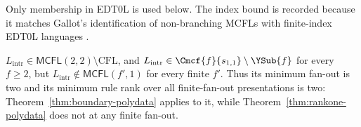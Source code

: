 Only membership in EDT0L is used below.  The index bound is recorded because it
matches Gallot's identification of non-branching MCFLs with finite-index EDT0L
languages \cite[Theorem~29]{Gallot2021}.

\begin{theorem}
\label{thm:intrinsic-ranktwo-witness}
$L_{\mathrm{intr}}\in\mathsf{MCFL}(2,2)\setminus\mathrm{CFL}$, and
$L_{\mathrm{intr}}\in\Cmcf{f}{s_{1,1}}\setminus\YSub{f}$ for every $f\ge2$, but
$L_{\mathrm{intr}}\notin\mathsf{MCFL}(f',1)$ for every finite $f'$.  Thus its minimum
fan-out is two and its minimum rule rank over all finite-fan-out presentations is
two: Theorem~\ref{thm:boundary-polydata} applies to it, while
Theorem~\ref{thm:rankone-polydata} does not at any finite fan-out.
\end{theorem}

